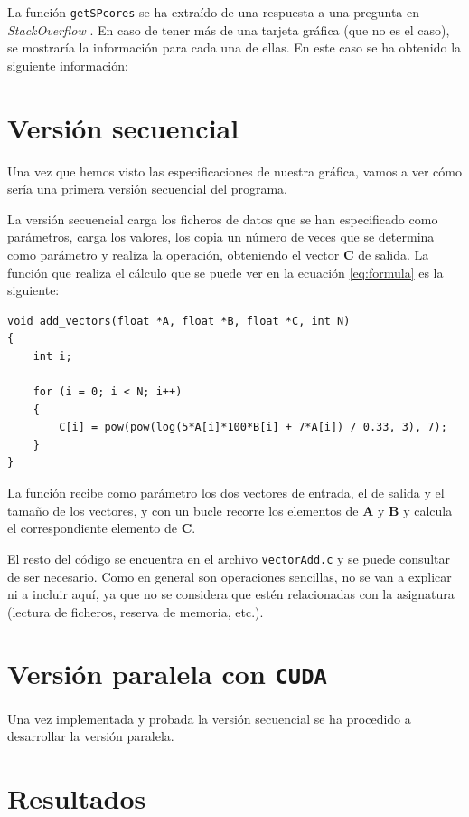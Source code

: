 \documentclass[11pt,a4paper]{article}
\renewcommand{\vec}[1]{\mathbf{#1}}
\begin{document}
La función \texttt{getSPcores} se ha extraído de una respuesta a una pregunta en
\textit{StackOverflow} \cite{cuda-sp}. En caso de tener más de una tarjeta gráfica
(que no es el caso), se mostraría la información para cada una de ellas. En este
caso se ha obtenido la siguiente información:


\section{Versión secuencial}

Una vez que hemos visto las especificaciones de nuestra gráfica, vamos a ver cómo sería
una primera versión secuencial del programa.

La versión secuencial carga los ficheros de datos que se han especificado como parámetros,
carga los valores, los copia un número de veces que se determina como parámetro y realiza
la operación, obteniendo el vector $\vec{C}$ de salida. La función que realiza el cálculo
que se puede ver en la ecuación \eqref{eq:formula} es la siguiente:

\begin{lstlisting}
void add_vectors(float *A, float *B, float *C, int N)
{
    int i;

    for (i = 0; i < N; i++)
    {
        C[i] = pow(pow(log(5*A[i]*100*B[i] + 7*A[i]) / 0.33, 3), 7);
    }
}
\end{lstlisting}

La función recibe como parámetro los dos vectores de entrada, el de salida y el
tamaño de los vectores, y con un bucle recorre los elementos de $\vec{A}$ y $\vec{B}$
y calcula el correspondiente elemento de $\vec{C}$.

El resto del código se encuentra en el archivo \texttt{vectorAdd.c} y se puede consultar
de ser necesario. Como en general son operaciones sencillas, no se van a explicar ni a incluir
aquí, ya que no se considera que estén relacionadas con la asignatura (lectura de ficheros,
reserva de memoria, etc.).

\section{Versión paralela con \texttt{CUDA}}

Una vez implementada y probada la versión secuencial se ha procedido a desarrollar
la versión paralela.

\section{Resultados}
\end{document}
